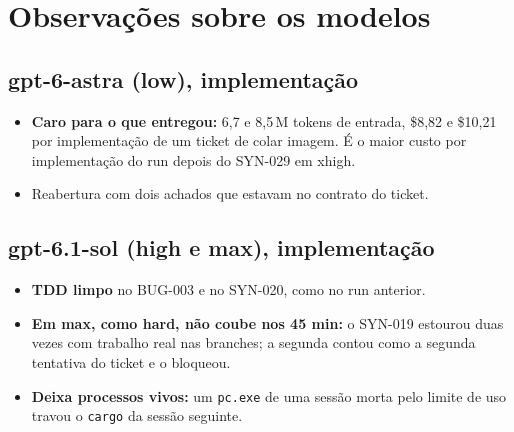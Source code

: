 \documentclass[11pt,a4paper]{article}
\begin{document}
\section{Observações sobre os modelos}

\subsection*{gpt-6-astra (low), implementação}
\begin{itemize}
  \item \textbf{Caro para o que entregou:} 6,7 e 8,5\,M tokens de entrada,
        \$8,82 e \$10,21 por implementação de um ticket de colar imagem. É o
        maior custo por implementação do run depois do SYN-029 em xhigh.
  \item Reabertura com dois achados que estavam no contrato do ticket.
\end{itemize}

\subsection*{gpt-6.1-sol (high e max), implementação}
\begin{itemize}
  \item \textbf{TDD limpo} no BUG-003 e no SYN-020, como no run anterior.
  \item \textbf{Em max, como hard, não coube nos 45 min:} o SYN-019 estourou
        duas vezes com trabalho real nas branches; a segunda contou como a
        segunda tentativa do ticket e o bloqueou.
  \item \textbf{Deixa processos vivos:} um \texttt{pc.exe} de uma sessão morta
        pelo limite de uso travou o \texttt{cargo} da sessão seguinte.
\end{itemize}
\end{document}
